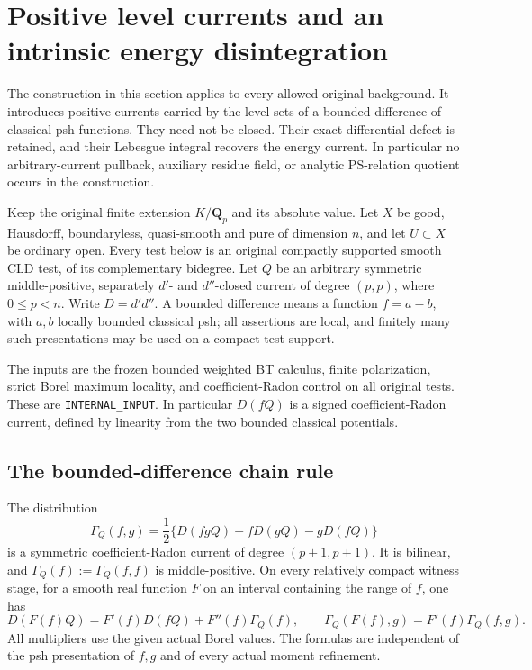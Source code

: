 \section{Positive level currents and an intrinsic energy disintegration}
\label{sec:r11-level-disintegration}

The construction in this section applies to every allowed original
background.  It introduces positive currents carried by the level sets
of a bounded difference of classical psh functions.  They need not be
closed.  Their exact differential defect is retained, and their
Lebesgue integral recovers the energy current.  In particular no
arbitrary-current pullback, auxiliary residue field, or analytic
PS-relation quotient occurs in the construction.

Keep the original finite extension $K/\mathbf Q_p$ and its absolute
value.  Let $X$ be good, Hausdorff, boundaryless, quasi-smooth and pure
of dimension $n$, and let $U\subset X$ be ordinary open.  Every test
below is an original compactly supported smooth CLD test, of its
complementary bidegree.  Let $Q$ be an arbitrary symmetric
middle-positive, separately $d'$- and $d''$-closed current of degree
$(p,p)$, where $0\le p<n$.  Write $D=d'd''$.  A bounded difference
means a function $f=a-b$, with $a,b$ locally bounded classical psh;
all assertions are local, and finitely many such presentations may
be used on a compact test support.

The inputs are the frozen bounded weighted BT calculus, finite
polarization, strict Borel maximum locality, and coefficient-Radon
control on all original tests.  These are
\texttt{INTERNAL\_INPUT}.  In particular $D(fQ)$ is a signed
coefficient-Radon current, defined by linearity from the two bounded
classical potentials.

\subsection{The bounded-difference chain rule}

\begin{lemma}
\label{lem:r11-bounded-difference-chain}
The distribution
\[
 \Gamma_Q(f,g)
 =\frac12\{D(fgQ)-fD(gQ)-gD(fQ)\}
 \tag{LC1}
\]
is a symmetric coefficient-Radon current of degree $(p+1,p+1)$.
It is bilinear, and $\Gamma_Q(f):=\Gamma_Q(f,f)$ is
middle-positive.  On every relatively compact witness stage,
for a smooth real function $F$ on an interval containing the range
of $f$, one has
\[
 D(F(f)Q)=F'(f)D(fQ)+F''(f)\Gamma_Q(f),
 \qquad
 \Gamma_Q(F(f),g)=F'(f)\Gamma_Q(f,g).
 \tag{LC2}
\]
All multipliers use the given actual Borel values.  The formulas
are independent of the psh presentation of $f,g$ and of every
actual moment refinement.
\end{lemma}

